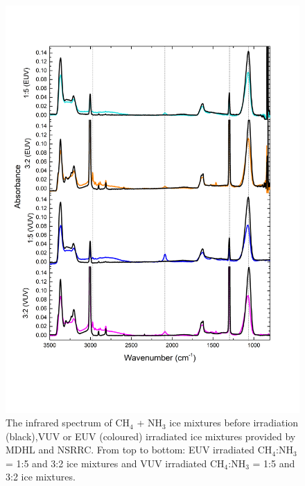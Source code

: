 \begin{figure}
\centering
\includegraphics[width=\textwidth]{figures/chapter3/EUV_widerange.png}
\caption{The infrared spectrum of CH$_4$ + NH$_3$ ice mixtures before irradiation (black),VUV or EUV (coloured) irradiated ice mixtures provided by MDHL and NSRRC. From top to bottom: EUV irradiated CH$_4$:NH$_3$ = 1:5 and 3:2 ice mixtures and VUV irradiated CH$_4$:NH$_3$ = 1:5 and 3:2 ice mixtures.}
\label{fig:NSRRC_MDHL_IR}
\end{figure}


